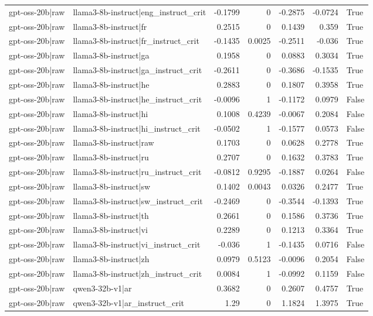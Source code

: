 \begin{table}
\begin{tabular}{l l r r r r l}
gpt-oss-20b|raw & llama3-8b-instruct|eng_instruct_crit & -0.1799 & 0 & -0.2875 & -0.0724 & True \\
gpt-oss-20b|raw & llama3-8b-instruct|fr & 0.2515 & 0 & 0.1439 & 0.359 & True \\
gpt-oss-20b|raw & llama3-8b-instruct|fr_instruct_crit & -0.1435 & 0.0025 & -0.2511 & -0.036 & True \\
gpt-oss-20b|raw & llama3-8b-instruct|ga & 0.1958 & 0 & 0.0883 & 0.3034 & True \\
gpt-oss-20b|raw & llama3-8b-instruct|ga_instruct_crit & -0.2611 & 0 & -0.3686 & -0.1535 & True \\
gpt-oss-20b|raw & llama3-8b-instruct|he & 0.2883 & 0 & 0.1807 & 0.3958 & True \\
gpt-oss-20b|raw & llama3-8b-instruct|he_instruct_crit & -0.0096 & 1 & -0.1172 & 0.0979 & False \\
gpt-oss-20b|raw & llama3-8b-instruct|hi & 0.1008 & 0.4239 & -0.0067 & 0.2084 & False \\
gpt-oss-20b|raw & llama3-8b-instruct|hi_instruct_crit & -0.0502 & 1 & -0.1577 & 0.0573 & False \\
gpt-oss-20b|raw & llama3-8b-instruct|raw & 0.1703 & 0 & 0.0628 & 0.2778 & True \\
gpt-oss-20b|raw & llama3-8b-instruct|ru & 0.2707 & 0 & 0.1632 & 0.3783 & True \\
gpt-oss-20b|raw & llama3-8b-instruct|ru_instruct_crit & -0.0812 & 0.9295 & -0.1887 & 0.0264 & False \\
gpt-oss-20b|raw & llama3-8b-instruct|sw & 0.1402 & 0.0043 & 0.0326 & 0.2477 & True \\
gpt-oss-20b|raw & llama3-8b-instruct|sw_instruct_crit & -0.2469 & 0 & -0.3544 & -0.1393 & True \\
gpt-oss-20b|raw & llama3-8b-instruct|th & 0.2661 & 0 & 0.1586 & 0.3736 & True \\
gpt-oss-20b|raw & llama3-8b-instruct|vi & 0.2289 & 0 & 0.1213 & 0.3364 & True \\
gpt-oss-20b|raw & llama3-8b-instruct|vi_instruct_crit & -0.036 & 1 & -0.1435 & 0.0716 & False \\
gpt-oss-20b|raw & llama3-8b-instruct|zh & 0.0979 & 0.5123 & -0.0096 & 0.2054 & False \\
gpt-oss-20b|raw & llama3-8b-instruct|zh_instruct_crit & 0.0084 & 1 & -0.0992 & 0.1159 & False \\
gpt-oss-20b|raw & qwen3-32b-v1|ar & 0.3682 & 0 & 0.2607 & 0.4757 & True \\
gpt-oss-20b|raw & qwen3-32b-v1|ar_instruct_crit & 1.29 & 0 & 1.1824 & 1.3975 & True \\

\end{tabular}
\end{table}
